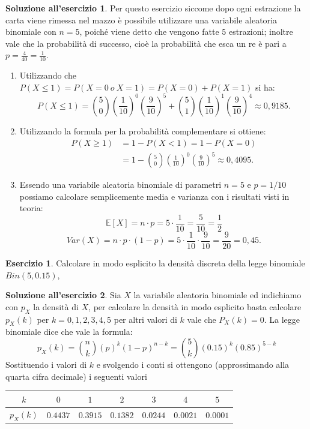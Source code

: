 \documentclass[12pt,a4paper]{article}
\theoremstyle{definition}
\newtheorem{sol}{Soluzione all'esercizio}
\newtheorem{exe}{Esercizio}
\begin{document}
\begin{sol} Per questo esercizio siccome dopo ogni estrazione la carta viene rimessa nel mazzo è possibile utilizzare una variabile aleatoria binomiale con $ n=5 $, poiché viene detto che vengono fatte $ 5 $ estrazioni; inoltre vale che la probabilità di successo, cioè la probabilità che esca un re è pari a $ p = \frac{4}{40} = \frac{1}{10} $.
	\begin{enumerate}
		\item Utilizzando che $ P(X \le 1) = P(X=0 \ o \ X=1) = P(X=0) + P(X=1) $ si ha:
		      \[ P(X \le 1) = \binom{5}{0}\left( \frac{1}{10}\right)^{0}\left( \frac{9}{10}\right)^{5} + \binom{5}{1}\left( \frac{1}{10}\right)^{1}\left( \frac{9}{10}\right)^{4} \approx 0,9185. \]
		\item Utilizzando la formula per la probabilità complementare si ottiene:
		      \[ \begin{split}
				      P(X \ge 1) & = 1 - P(X<1) = 1 - P(X=0)                                                                      \\
				                 & = 1 - \binom{5}{0}\left( \frac{1}{10}\right)^{0}\left( \frac{9}{10}\right)^{5} \approx 0,4095.
			      \end{split}  \]
		\item Essendo una variabile aleatoria binomiale di parametri $ n = 5 $ e $ p= 1/10 $ possiamo calcolare semplicemente media e varianza con i risultati visti in teoria:
		      \[ \mathbb{E}[X] = n \cdot p = 5\cdot \frac{1}{10} = \frac{5}{10} = \frac12 \]
		      \[ Var(X) = n\cdot p\cdot (1-p) = 5 \cdot \frac{1}{10}\cdot \frac{9}{10} = \frac{9}{20} = 0,45. \]
	\end{enumerate}
\end{sol}

\begin{exe}
	Calcolare in modo esplicito la densità discreta della legge binomiale $ Bin(5, 0.15) $,
\end{exe}

\begin{sol}
	Sia $ X $ la variabile aleatoria binomiale ed indichiamo con $ p_{X} $ la densità di $ X $, per calcolare la densità in modo esplicito basta calcolare $ p_{X}(k) $ per $ k = 0, 1, 2, 3, 4, 5 $ per altri valori di $ k $ vale che $ P_X(k) = 0 $. La legge binomiale dice che vale la formula:
	\[ p_{X}(k) = \binom{n}{k}\left(p\right)^{k}\left(1-p\right)^{n-k} = \binom{5}{k}\left(0.15\right)^{k}\left(0.85\right)^{5-k} \]
	Sostituendo i valori di $ k $ e svolgendo i conti si ottengono (approssimando alla quarta cifra decimale) i seguenti valori
	\begin{center}
		\begin{tabular}{|c|c|c|c|c|c|c|}
			\hline
			$ k $        & $ 0 $      & $ 1 $      & $ 2 $      & $ 3 $      & $ 4 $      & $ 5 $      \\
			\hline
			$ p_{X}(k) $ & $ 0.4437 $ & $ 0.3915 $ & $ 0.1382 $ & $ 0.0244 $ & $ 0.0021 $ & $ 0.0001 $
			\\
			\hline
		\end{tabular}
	\end{center}
\end{sol}
\end{document}
